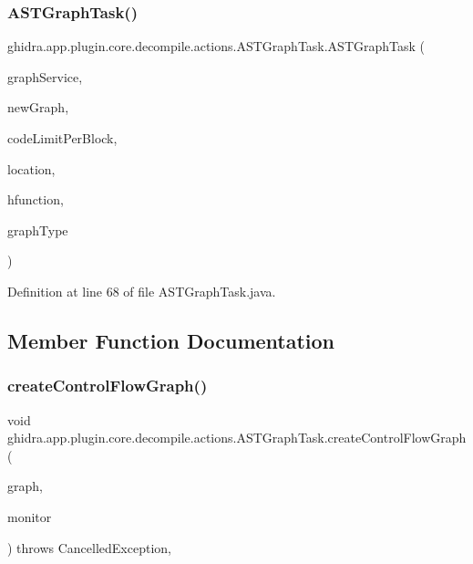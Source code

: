 \subsubsection{\texorpdfstring{ASTGraphTask()}{ASTGraphTask()}}
{\footnotesize\ttfamily ghidra.\+app.\+plugin.\+core.\+decompile.\+actions.\+A\+S\+T\+Graph\+Task.\+A\+S\+T\+Graph\+Task (\begin{DoxyParamCaption}\item[{Graph\+Service}]{graph\+Service,  }\item[{boolean}]{new\+Graph,  }\item[{int}]{code\+Limit\+Per\+Block,  }\item[{\mbox{\hyperlink{class_address}{Address}}}]{location,  }\item[{High\+Function}]{hfunction,  }\item[{int}]{graph\+Type }\end{DoxyParamCaption})\hspace{0.3cm}{\ttfamily [inline]}}



Definition at line 68 of file A\+S\+T\+Graph\+Task.\+java.



\subsection{Member Function Documentation}
\mbox{\label{classghidra_1_1app_1_1plugin_1_1core_1_1decompile_1_1actions_1_1_a_s_t_graph_task_ab294e8153df90959f5b9d7ca7bd53f26}} 
\subsubsection{\texorpdfstring{createControlFlowGraph()}{createControlFlowGraph()}}
{\footnotesize\ttfamily void ghidra.\+app.\+plugin.\+core.\+decompile.\+actions.\+A\+S\+T\+Graph\+Task.\+create\+Control\+Flow\+Graph (\begin{DoxyParamCaption}\item[{Graph\+Data}]{graph,  }\item[{Task\+Monitor}]{monitor }\end{DoxyParamCaption}) throws Cancelled\+Exception\hspace{0.3cm}{\ttfamily [inline]}, {\ttfamily [protected]}}




